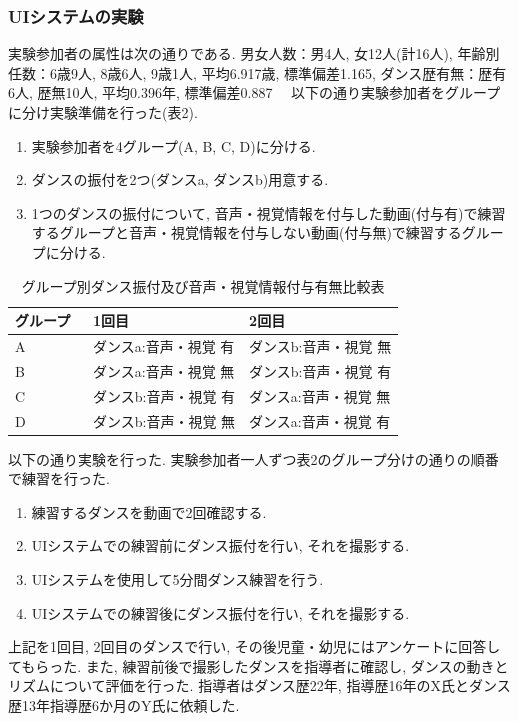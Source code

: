 \documentclass[paper]{ieicej}
\begin{document}
\subsubsection{UIシステムの実験}
実験参加者の属性は次の通りである. 男女人数：男4人, 女12人(計16人), 年齢別任数：6歳9人, 8歳6人, 9歳1人, 平均6.917歳, 標準偏差1.165, ダンス歴有無：歴有6人, 歴無10人, 平均0.396年, 標準偏差0.887
　以下の通り実験参加者をグループに分け実験準備を行った(表2).
\begin{enumerate}[label=\arabic*., nosep]
  \item 実験参加者を4グループ(A, B, C, D)に分ける. 
  \item ダンスの振付を2つ(ダンスa, ダンスb)用意する. 
  \item 1つのダンスの振付について, 音声・視覚情報を付与した動画(付与有)で練習するグループと音声・視覚情報を付与しない動画(付与無)で練習するグループに分ける. 
\end{enumerate}
\begin{table}[t]
  \centering
  \caption{グループ別ダンス振付及び音声・視覚情報付与有無比較表}
  \begin{tabularx}{\linewidth}{l p{0.4\linewidth} p{0.4\linewidth}}
    \toprule
      グループ & 1回目 & 2回目 \\
    \midrule
      A & ダンスa:音声・視覚 有 & ダンスb:音声・視覚 無 \\
      B & ダンスa:音声・視覚 無 & ダンスb:音声・視覚 有 \\
      C & ダンスb:音声・視覚 有 & ダンスa:音声・視覚 無 \\
      D & ダンスb:音声・視覚 無 & ダンスa:音声・視覚 有 \\
    \bottomrule
  \end{tabularx}
\end{table}
以下の通り実験を行った. 実験参加者一人ずつ表2のグループ分けの通りの順番で練習を行った.
\begin{enumerate}[label=\arabic*., nosep]
  \item 練習するダンスを動画で2回確認する.  
  \item UIシステムでの練習前にダンス振付を行い, それを撮影する.
  \item UIシステムを使用して5分間ダンス練習を行う. 
  \item UIシステムでの練習後にダンス振付を行い, それを撮影する.
\end{enumerate}
上記を1回目, 2回目のダンスで行い, その後児童・幼児にはアンケートに回答してもらった. また, 練習前後で撮影したダンスを指導者に確認し, ダンスの動きとリズムについて評価を行った. 指導者はダンス歴22年, 指導歴16年のX氏とダンス歴13年指導歴6か月のY氏に依頼した. \\
\end{document}
